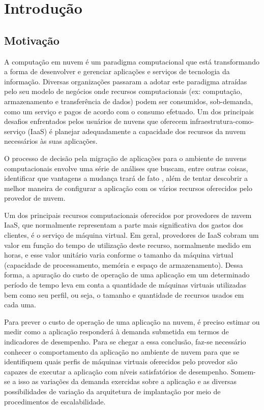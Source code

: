 \chapter[Introdução]{Introdução}
\section{Motivação}
A computação em nuvem é um paradigma computacional que está
transformando a forma de desenvolver e gerenciar aplicações e serviços de
tecnologia da informação. Diversas organizações passaram a adotar este paradigma
atraídas pelo seu modelo de negócios onde recursos computacionais (ex:
computação, armazenamento e transferência de dados) podem ser consumidos, sob-demanda, 
como um serviço e pagos de acordo com o consumo efetuado. Um dos principais
desafios enfrentados pelos usuários de nuvens que oferecem 
infraestrutura-como-serviço (IaaS) é planejar adequadamente a capacidade 
dos recursos da nuvem necessários às suas aplicações.  

O processo de decisão pela migração de aplicações para o ambiente de nuvens 
computacionais envolve uma série de análises que buscam, entre outras coisas, 
identificar que vantagens a mudança trará de fato \cite{li2011cloudprophet, 
rodero2010infrastructure}, além de tentar descobrir a melhor maneira de configurar 
a aplicação com os vários recursos oferecidos pelo provedor de nuvem.

Um dos principais recursos computacionais oferecidos por provedores de nuvem
IaaS, que normalmente representam a parte mais significativa dos gastos dos
clientes, é o serviço de máquina virtual. Em geral, provedores de IaaS cobram um
valor em função do tempo de utilização deste recurso, normalmente medido em horas, 
e esse valor unitário varia conforme o tamanho da máquina virtual (capacidade de 
processamento, memória e espaço de armazenamento). Dessa forma, a apuração do 
custo de operação de uma aplicação em um determinado período de tempo leva em 
conta a quantidade de máquinas virtuais utilizadas bem como seu perfil, ou seja, 
o tamanho e quantidade de recursos usados em cada uma.
 
Para prever o custo de operação de uma aplicação na nuvem, é preciso estimar ou 
medir como a aplicação responderá à demanda submetida em termos de indicadores de 
desempenho. Para se chegar a essa conclusão, faz-se necessário conhecer o 
comportamento da aplicação no ambiente de nuvem para que se identifiquem quais 
perfis de máquinas virtuais oferecidos pelo provedor são capazes de executar a 
aplicação com níveis satisfatórios de desempenho. Somem-se a isso as variações 
da demanda exercidas sobre a aplicação e as diversas possibilidades de variação 
da arquitetura de implantação por meio de procedimentos de escalabilidade.
 
